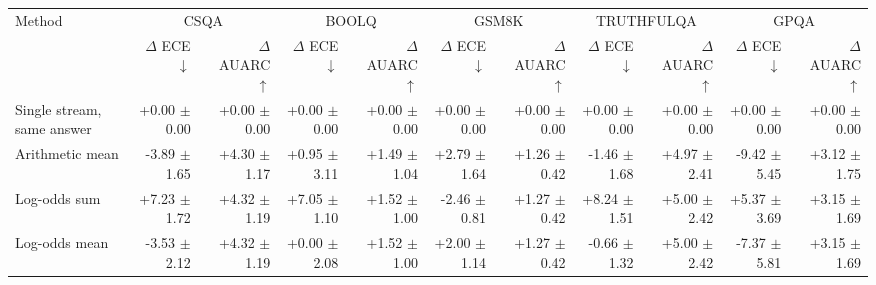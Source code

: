\begin{tabular}{lrrrrrrrrrr}
\toprule
Method & \multicolumn{2}{c}{CSQA} & \multicolumn{2}{c}{BOOLQ} & \multicolumn{2}{c}{GSM8K} & \multicolumn{2}{c}{TRUTHFULQA} & \multicolumn{2}{c}{GPQA} \\
 & $\Delta$ ECE $\downarrow$ & $\Delta$ AUARC $\uparrow$ & $\Delta$ ECE $\downarrow$ & $\Delta$ AUARC $\uparrow$ & $\Delta$ ECE $\downarrow$ & $\Delta$ AUARC $\uparrow$ & $\Delta$ ECE $\downarrow$ & $\Delta$ AUARC $\uparrow$ & $\Delta$ ECE $\downarrow$ & $\Delta$ AUARC $\uparrow$ \\
\midrule
Single stream, same answer & +0.00 {\scriptsize $\pm$ 0.00} & +0.00 {\scriptsize $\pm$ 0.00} & +0.00 {\scriptsize $\pm$ 0.00} & +0.00 {\scriptsize $\pm$ 0.00} & +0.00 {\scriptsize $\pm$ 0.00} & +0.00 {\scriptsize $\pm$ 0.00} & +0.00 {\scriptsize $\pm$ 0.00} & +0.00 {\scriptsize $\pm$ 0.00} & +0.00 {\scriptsize $\pm$ 0.00} & +0.00 {\scriptsize $\pm$ 0.00} \\
Arithmetic mean & -3.89 {\scriptsize $\pm$ 1.65} & +4.30 {\scriptsize $\pm$ 1.17} & +0.95 {\scriptsize $\pm$ 3.11} & +1.49 {\scriptsize $\pm$ 1.04} & +2.79 {\scriptsize $\pm$ 1.64} & +1.26 {\scriptsize $\pm$ 0.42} & -1.46 {\scriptsize $\pm$ 1.68} & +4.97 {\scriptsize $\pm$ 2.41} & -9.42 {\scriptsize $\pm$ 5.45} & +3.12 {\scriptsize $\pm$ 1.75} \\
Log-odds sum & +7.23 {\scriptsize $\pm$ 1.72} & +4.32 {\scriptsize $\pm$ 1.19} & +7.05 {\scriptsize $\pm$ 1.10} & +1.52 {\scriptsize $\pm$ 1.00} & -2.46 {\scriptsize $\pm$ 0.81} & +1.27 {\scriptsize $\pm$ 0.42} & +8.24 {\scriptsize $\pm$ 1.51} & +5.00 {\scriptsize $\pm$ 2.42} & +5.37 {\scriptsize $\pm$ 3.69} & +3.15 {\scriptsize $\pm$ 1.69} \\
Log-odds mean & -3.53 {\scriptsize $\pm$ 2.12} & +4.32 {\scriptsize $\pm$ 1.19} & +0.00 {\scriptsize $\pm$ 2.08} & +1.52 {\scriptsize $\pm$ 1.00} & +2.00 {\scriptsize $\pm$ 1.14} & +1.27 {\scriptsize $\pm$ 0.42} & -0.66 {\scriptsize $\pm$ 1.32} & +5.00 {\scriptsize $\pm$ 2.42} & -7.37 {\scriptsize $\pm$ 5.81} & +3.15 {\scriptsize $\pm$ 1.69} \\

\end{tabular}
